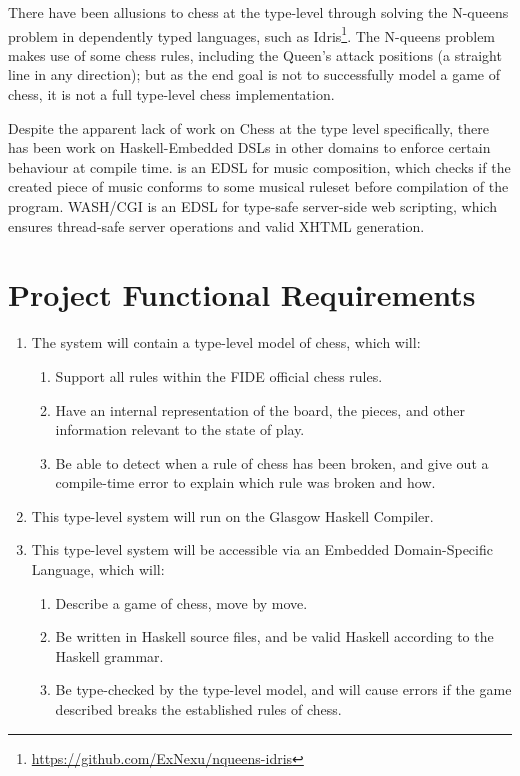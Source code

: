 \documentclass[12pt, a4paper]{scrartcl}
\begin{document}
There have been allusions to chess at the type-level through solving the N-queens problem in dependently typed languages, such as Idris\cite{idrisnqueens}\footnote{\url{https://github.com/ExNexu/nqueens-idris}}. The N-queens problem makes use of some chess rules, including the Queen's attack positions (a straight line in any direction); but as the end goal is not to successfully model a game of chess, it is not a full type-level chess implementation.

Despite the apparent lack of work on Chess at the type level specifically, there has been work on Haskell-Embedded DSLs in other domains to enforce certain behaviour at compile time. \cite{mezzohaskellsymposium} is an EDSL for music composition, which checks if the created piece of music conforms to some musical ruleset before compilation of the program. WASH/CGI\cite{washcgi} is an EDSL for type-safe server-side web scripting, which ensures thread-safe server operations and valid XHTML generation.

\section{Project Functional Requirements}

\begin{enumerate}
    \item The system will contain a type-level model of chess, which will:
          \begin{enumerate}
              \item Support all rules within the FIDE official chess rules.
              \item Have an internal representation of the board, the pieces, and other information relevant to the state of play.
              \item Be able to detect when a rule of chess has been broken, and give out a compile-time error to explain which rule was broken and how.
          \end{enumerate}
    \item This type-level system will run on the Glasgow Haskell Compiler.
    \item This type-level system will be accessible via an Embedded Domain-Specific Language, which will:
          \begin{enumerate}
              \item Describe a game of chess, move by move.
              \item Be written in Haskell source files, and be valid Haskell according to the Haskell grammar.
              \item Be type-checked by the type-level model, and will cause errors if the game described breaks the established rules of chess.
          \end{enumerate}
\end{enumerate}
\end{document}
